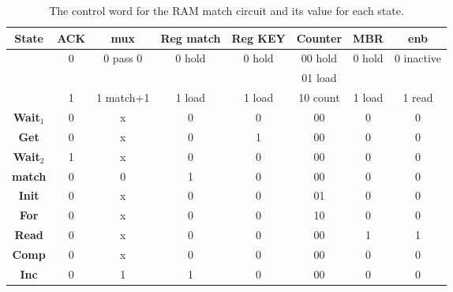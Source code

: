 \begin{table}
    {\tiny
        \begin{tabular}{c||c|c|c|c|c|c|c}
            \textbf{ State }  & ACK   & mux       &  Reg match& Reg KEY & Counter     & MBR    & enb     \\ \hline
            & 0     & 0 pass 0  &  0 hold   & 0 hold                      & 00 hold     & 0 hold  & 0 inactive \\ \hline
            &       &           &           &                                     & 01 load     &
            &                 \\ \hline
            & 1     & 1 match+1 &  1 load   & 1 load                  & 10 count    & 1 load & 1 read  \\ \hline \hline
            \textbf{ Wait$_1$ }  & 0     & x         & 0         & 0       & 00          & 0      & 0
            \\ \hline
            \textbf{ Get   }  & 0     & x         & 0         & 1       & 00          & 0      & 0
            \\ \hline
            \textbf{ Wait$_2$ }  & 1     & x         & 0         & 0       & 00          & 0      & 0       \\ \hline
            \textbf{ match }   & 0     & 0         & 1         & 0       & 00          & 0      & 0         \\ \hline
            \textbf{ Init }   & 0     & x         & 0         & 0       & 01          & 0      & 0            \\ \hline
            \textbf{ For  }   & 0     & x         & 0         & 0       & 10          & 0      & 0         \\ \hline
            \textbf{ Read }   & 0     & x         & 0         & 0       & 00          & 1      & 1           \\ \hline
            \textbf{ Comp }   & 0     & x         & 0         & 0       & 00          & 0      & 0           \\ \hline
            \textbf{ Inc }    & 0     & 1         & 1         & 0       & 00          & 0      & 0           \\
        \end{tabular}
    }
    \caption{The control word for the RAM match circuit and its value for each state.}
    \label{table:RAMmatch}
\end{table}


